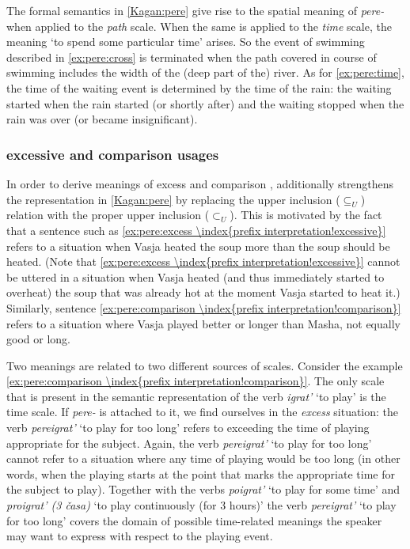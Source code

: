 The formal semantics in \ref{Kagan:pere} give rise to the spatial  meaning of \textit{pere-}   when applied to the \textit{path} scale. When the same is applied to the \textit{time} scale, the meaning `to spend some particular time' arises. So the event of swimming described in \ref{ex:pere:cross} is terminated when the path covered in course of swimming includes the width of the (deep part of the) river. As for \ref{ex:pere:time}, the time of the waiting event is determined by the time of the rain: the waiting started when the rain started (or shortly after) and the waiting stopped when the rain was over (or became insignificant).

\subsubsection{excessive  and comparison  usages}
In order to derive meanings of excess  and comparison , \citet[133]{Kagan:book} additionally strengthens the representation in \ref{Kagan:pere} by replacing the upper inclusion ($\subseteq _U$) relation with the proper upper inclusion ($\subset _U$). This is motivated by the fact that a sentence such as \ref{ex:pere:excess \index{prefix interpretation!excessive}} refers to a situation when Vasja heated the soup more than the soup should be heated. (Note that \ref{ex:pere:excess \index{prefix interpretation!excessive}} cannot be uttered in a situation when Vasja heated (and thus immediately started to overheat) the soup that was already hot at the moment Vasja started to heat it.) Similarly, sentence \ref{ex:pere:comparison \index{prefix interpretation!comparison}} refers to a situation where Vasja played better or longer than Masha, not equally good or long.

Two meanings are related to two different sources of scales. Consider the example \ref{ex:pere:comparison \index{prefix interpretation!comparison}}. The only scale that is present in the semantic representation of the verb \textit{igrat'} `to play' is the time scale. If \textit{pere-}   is attached to it, we find ourselves in the \textit{excess } situation: the verb \textit{pereigrat'} `to play for too long' refers to exceeding the time of playing appropriate for the subject. Again, the verb \textit{pereigrat'} `to play for too long' cannot refer to a situation where any time of playing would be too long (in other words, when the playing starts at the point that marks the appropriate time for the subject to play). Together with the verbs \textit{poigrat'} `to play for some time' and \textit{proigrat' (3 \v{c}asa)} `to play continuously (for 3 hours)' the verb \textit{pereigrat'} `to play for too long' covers the domain of possible time-related meanings the speaker may want to express with respect to the playing event.

